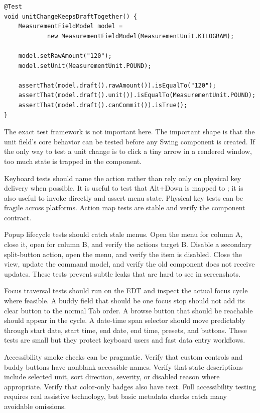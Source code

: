 \begin{lstlisting}[caption={A model test can avoid Swing entirely.}]
@Test
void unitChangeKeepsDraftTogether() {
    MeasurementFieldModel model =
            new MeasurementFieldModel(MeasurementUnit.KILOGRAM);

    model.setRawAmount("120");
    model.setUnit(MeasurementUnit.POUND);

    assertThat(model.draft().rawAmount()).isEqualTo("120");
    assertThat(model.draft().unit()).isEqualTo(MeasurementUnit.POUND);
    assertThat(model.draft().canCommit()).isTrue();
}
\end{lstlisting}

The exact test framework is not important here. The important shape is that the unit
field's core behavior can be tested before any Swing component is created. If the only
way to test a unit change is to click a tiny arrow in a rendered window, too much state
is trapped in the component.

Keyboard tests should name the action rather than rely only on physical key delivery
when possible. It is useful to test that Alt+Down is mapped to
; it is also useful to invoke  directly and
assert menu state. Physical key tests can be fragile across platforms. Action map tests
are stable and verify the component contract.

Popup lifecycle tests should catch stale menus. Open the menu for column A, close it,
open for column B, and verify the actions target B. Disable a secondary split-button
action, open the menu, and verify the item is disabled. Close the view, update the
command model, and verify the old component does not receive updates. These tests
prevent subtle leaks that are hard to see in screenshots.

Focus traversal tests should run on the EDT and inspect the actual focus cycle where
feasible. A buddy field that should be one focus stop should not add its clear button to
the normal Tab order. A browse button that should be reachable should appear in the
cycle. A date-time span selector should move predictably through start date, start time,
end date, end time, presets, and buttons. These tests are small but they protect
keyboard users and fast data entry workflows.

Accessibility smoke checks can be pragmatic. Verify that custom controls and buddy
buttons have nonblank accessible names. Verify that state descriptions include selected
unit, sort direction, severity, or disabled reason where appropriate. Verify that
color-only badges also have text. Full accessibility testing requires real assistive
technology, but basic metadata checks catch many avoidable omissions.

